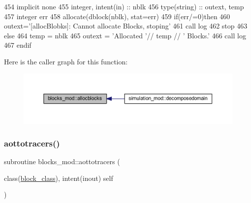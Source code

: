 \begin{DoxyCode}
454     \textcolor{keywordtype}{implicit none}
455     \textcolor{keywordtype}{integer}, \textcolor{keywordtype}{intent(in)} ::  nblk
456     \textcolor{keywordtype}{type}(string) :: outext, temp
457     \textcolor{keywordtype}{integer} err
458     \textcolor{keyword}{allocate}(dblock(nblk), stat=err)
459     \textcolor{keywordflow}{if}(err/=0)\textcolor{keywordflow}{then}
460         outext=\textcolor{stringliteral}{'[allocBlobks]: Cannot allocate Blocks, stoping'}
461         \textcolor{keyword}{call }log%
462         stop
463     \textcolor{keywordflow}{else}
464         temp = nblk
465         outext = \textcolor{stringliteral}{'Allocated '}// temp // \textcolor{stringliteral}{' Blocks.'}
466         \textcolor{keyword}{call }log%
467 \textcolor{keywordflow}{    endif}
\end{DoxyCode}
Here is the caller graph for this function\+:\nopagebreak
\begin{figure}[H]
\begin{center}
\leavevmode
\includegraphics[width=350pt]{namespaceblocks__mod_a639beb0fee2290d46353f4b4702d6711_icgraph}
\end{center}
\end{figure}
\mbox{\label{namespaceblocks__mod_a27c7e788c5f3979bfe9d43aad138286a}} 
\subsubsection{\texorpdfstring{aottotracers()}{aottotracers()}}
{\footnotesize\ttfamily subroutine blocks\+\_\+mod\+::aottotracers (\begin{DoxyParamCaption}\item[{class(\mbox{\hyperlink{structblocks__mod_1_1block__class}{block\+\_\+class}}), intent(inout)}]{self }\end{DoxyParamCaption})\hspace{0.3cm}{\ttfamily [private]}}




